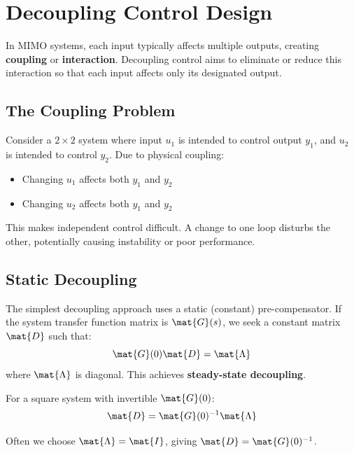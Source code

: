 \section{Decoupling Control Design}
\label{sec:decoupling}

In MIMO systems, each input typically affects multiple outputs, creating \textbf{coupling} or \textbf{interaction}. Decoupling control aims to eliminate or reduce this interaction so that each input affects only its designated output.

\subsection{The Coupling Problem}

Consider a $2 \times 2$ system where input $u_1$ is intended to control output $y_1$, and $u_2$ is intended to control $y_2$. Due to physical coupling:
\begin{itemize}
    \item Changing $u_1$ affects both $y_1$ and $y_2$
    \item Changing $u_2$ affects both $y_1$ and $y_2$
\end{itemize}

This makes independent control difficult. A change to one loop disturbs the other, potentially causing instability or poor performance.

\subsection{Static Decoupling}

The simplest decoupling approach uses a static (constant) pre-compensator. If the system transfer function matrix is $\mat{G}(s)$, we seek a constant matrix $\mat{D}$ such that:
\begin{equation}
\mat{G}(0)\mat{D} = \mat{\Lambda}
\end{equation}
where $\mat{\Lambda}$ is diagonal. This achieves \textbf{steady-state decoupling}.

For a square system with invertible $\mat{G}(0)$:
\begin{equation}
\mat{D} = \mat{G}(0)^{-1}\mat{\Lambda}
\end{equation}

Often we choose $\mat{\Lambda} = \mat{I}$, giving $\mat{D} = \mat{G}(0)^{-1}$.

